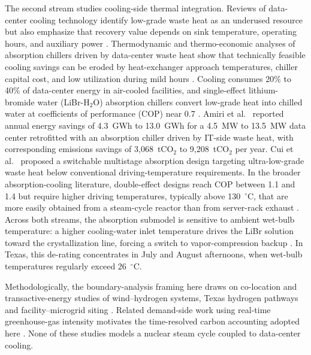 \documentclass[a4paper,fleqn]{cas-sc}
\begin{document}
The second stream studies cooling-side thermal integration. Reviews of data-center cooling technology identify low-grade waste heat as an underused resource but also emphasize that recovery value depends on sink temperature, operating hours, and auxiliary power \citep{ebrahimi2014review,yuan2023wasteHeatReview}. Thermodynamic and thermo-economic analyses of absorption chillers driven by data-center waste heat show that technically feasible cooling savings can be eroded by heat-exchanger approach temperatures, chiller capital cost, and low utilization during mild hours \citep{haywood2012thermodynamic,ebrahimi2015thermoeconomic}. Cooling consumes 20\% to 40\% of data-center energy in air-cooled facilities, and single-effect lithium-bromide water (LiBr-H$_2$O) absorption chillers convert low-grade heat into chilled water at coefficients of performance (COP) near 0.7 \citep{amiri2021}. Amiri et al.~\citep{amiri2021} reported annual energy savings of 4.3~GWh to 13.0~GWh for a 4.5~MW to 13.5~MW data center retrofitted with an absorption chiller driven by IT-side waste heat, with corresponding emissions savings of 3{,}068~tCO$_2$ to 9{,}208~tCO$_2$ per year. Cui et al.~\citep{cui2025switchable} proposed a switchable multistage absorption design targeting ultra-low-grade waste heat below conventional driving-temperature requirements. In the broader absorption-cooling literature, double-effect designs reach COP between 1.1 and 1.4 but require higher driving temperatures, typically above 130~$^\circ$C, that are more easily obtained from a steam-cycle reactor than from server-rack exhaust \citep{srikhirin2001absorption,herold2016absorption}. Across both streams, the absorption submodel is sensitive to ambient wet-bulb temperature: a higher cooling-water inlet temperature drives the LiBr solution toward the crystallization line, forcing a switch to vapor-compression backup \citep{cui2025switchable,herold2016absorption}. In Texas, this de-rating concentrates in July and August afternoons, when wet-bulb temperatures regularly exceed 26~$^\circ$C.

Methodologically, the boundary-analysis framing here draws on co-location and transactive-energy studies of wind--hydrogen systems, Texas hydrogen pathways and facility--microgrid siting \citep{li2024windHydrogen,li2025hydrogenTexas,li2023microgridLocation}. Related demand-side work using real-time greenhouse-gas intensity motivates the time-resolved carbon accounting adopted here \citep{li2025ghgDemand}. None of these studies models a nuclear steam cycle coupled to data-center cooling.
\end{document}
